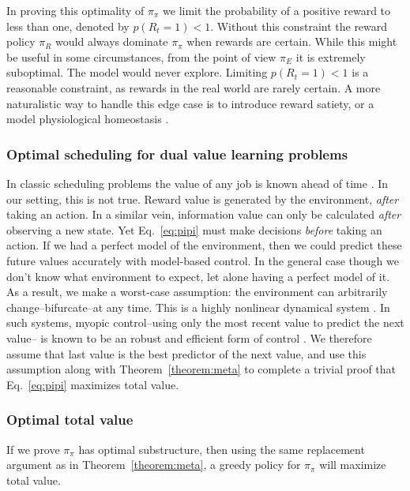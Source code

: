 In proving this optimality of $\pi_{\pi}$ we limit the probability of a positive reward to less than one, denoted by $p(R_t = 1) < 1$. Without this constraint the reward policy $\pi_R$ would always dominate $\pi_{\pi}$ when rewards are certain. While this might be useful in some circumstances, from the point of view $\pi_E$ it is extremely suboptimal. The model would never explore. Limiting $p(R_t = 1) < 1$ is a reasonable constraint, as rewards in the real world are rarely certain. A more naturalistic way to handle this edge case is to introduce reward satiety, or a model physiological homeostasis \cite{Keramati2014,Juechems2019}.

\subsubsection*{Optimal scheduling for dual value learning problems}
In classic scheduling problems the value of any job is known ahead of time \cite{Bellmann1954,Roughgarden2019}. In our setting, this is not true. Reward value is generated by the environment, \textit{after} taking an action. In a similar vein, information value can only be calculated \textit{after} observing a new state. Yet Eq.~\ref{eq:pipi} must make decisions \textit{before} taking an action. If we had a perfect model of the environment, then we could predict these future values accurately with model-based control. In the general case though we don't know what environment to expect, let alone having a perfect model of it. As a result, we make a worst-case assumption: the environment can arbitrarily change--bifurcate--at any time. This is a highly nonlinear dynamical system \cite{Strogatz1994}. In such systems, myopic control--using only the most recent value to predict the next value-- is known to be an robust and efficient form of control \cite{Hocker2019}. We therefore assume that last value is the best predictor of the next value, and use this assumption along with Theorem~\ref{theorem:meta} to complete a trivial proof that Eq.~\ref{eq:pipi} maximizes total value.

\subsubsection*{Optimal total value}
If we prove $\pi_{\pi}$ has optimal substructure, then using the same replacement argument \cite{Roughgarden2019} as in Theorem~\ref{theorem:meta}, a greedy policy for $\pi_\pi$ will maximize total value.

